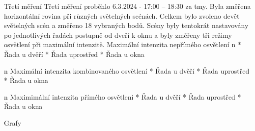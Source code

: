 \sec Třetí měření
Třetí měření proběhlo 6.3.2024 - 17:00 – 18:30 za tmy. Byla změřena horizontální rovina při různých světelných scénách. Celkem bylo zvoleno devět světelných scén a změřeno 18 vybraných bodů. Scény byly tentokrát nastavovány po jednotlivých řadách postupně od dveří k oknu a byly změřeny tři režimy osvětlení při maximální intenzitě.
\medskip
{\sbf Maximální intenzita nepřímého osvětlení}
\medskip
\begitems \style n
    * Řada u dvěří
    \medskip
    * Řada uprostřed
    \medskip
    * Řada u okna
\enditems

\medskip
\begitems \style n
{\sbf Maximální intenzita kombinovaného osvětlení}
\medskip
    * Řada u dvěří
    \medskip
    * Řada uprostřed
    \medskip
    * Řada u okna
\enditems
\medskip

\begitems \style n
{\sbf Maximimální intenzita přímého osvětlení}
\medskip
    * Řada u dvěří
    \medskip
    * Řada uprostřed
    \medskip
    * Řada u okna
\enditems
\medskip

\secc Grafy

\medskip
\medskip
\medskip
\midinsert
{}
\endinsert

\medskip
\medskip
\medskip


